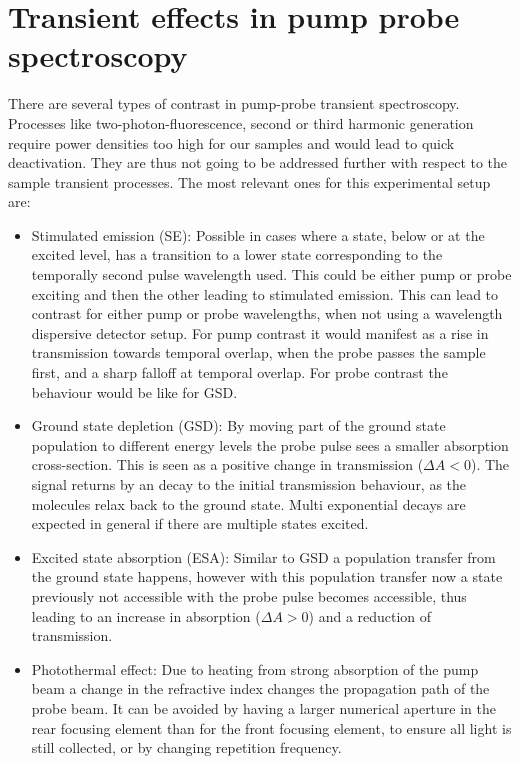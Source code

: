 \documentclass[twoside,openright,listof=numbered]{scrreprt}
\begin{document}
\section{Transient effects in pump probe spectroscopy}
There are several types of contrast in pump-probe transient spectroscopy. Processes like two-photon-fluorescence, second or third harmonic generation require power densities too high for our samples and would lead to quick deactivation. They are thus not going to be addressed further with respect to the sample transient processes. The most relevant ones for this experimental setup are:\cite{Zhu2020}
\begin{itemize}
\item Stimulated emission (SE): Possible in cases where a state, below or at the excited level, has a transition to a lower state corresponding to the temporally second pulse wavelength used. This could be either pump or probe exciting and then the other leading to stimulated emission. This can lead to contrast for either pump or probe wavelengths, when not using a wavelength dispersive detector setup. For pump contrast it would manifest as a rise in transmission towards temporal overlap, when the probe passes the sample first, and a sharp falloff at temporal overlap. For probe contrast the behaviour would be like for GSD.
\item Ground state depletion (GSD): By moving part of the ground state population to different energy levels the probe pulse sees a smaller absorption cross-section. This is seen as a positive change in transmission ($\Delta A < 0$). The signal returns by an  decay to the initial transmission behaviour, as the molecules relax back to the ground state. Multi exponential decays are expected in general if there are multiple states excited.
\item Excited state absorption (ESA): Similar to GSD a population transfer from the ground state happens, however with this population transfer now a state previously not accessible with the probe pulse becomes accessible, thus leading to an increase in absorption ($\Delta A > 0$) and a reduction of transmission.
\item Photothermal effect: Due to heating from strong absorption of the pump beam a change in the refractive index changes the propagation path of the probe beam. It can be avoided by having a larger numerical aperture in the rear focusing element than for the front focusing element, to ensure all light is still collected, or by changing repetition frequency.

\end{itemize}
\end{document}
